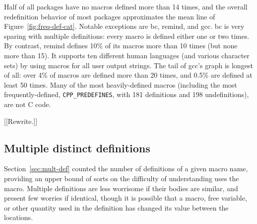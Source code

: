 \documentclass[10pt]{article}
\newcommand{\pkg}[1]{\textsf{#1}}
\newcommand{\captionsmall}[1]{\caption[]{\small #1}}
\begin{document}
Half of all packages have no macros defined more than 14 times, and the
overall redefinition behavior of most packages approximates the mean line
of Figure~\ref{fig:freq-def-cat}.  Notable exceptions are \pkg{bc},
\pkg{remind}, and \pkg{gcc}.  \pkg{bc} is very sparing with multiple
definitions: every macro is defined either one or two times.  By contrast, 
\pkg{remind} defines 10\% of its macros more than 10 times (but none more
than 15).  It supports ten different human languages (and various character
sets) by using macros for all user output strings.  The tail of \pkg{gcc}'s
graph is longest of all: over 4\% of macros are defined more than 20 times,
and 0.5\% are defined at least 50 times.  Many of the most heavily-defined
macros (including the most frequently-defined, \verb|CPP_PREDEFINES|, with
181 definitions and 198 undefinitions), are not C code.


[[Rewrite.]]


        
\subsection{Multiple distinct definitions}

Section~\ref{sec:mult-def} counted the number of definitions of a given
macro name, providing an upper bound of sorts on the difficulty of
understanding uses the macro.  Multiple definitions are less worrisome if
their bodies are similar, and present few worries if identical, though it
is possible that a macro, free variable, or other quantity used in the
definition has changed its value between the locations.

        
%   
\end{document}
